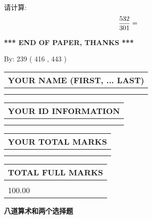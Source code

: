 \documentclass{ctexart}
\begin{document}
  
 
请计算:
\begin{equation}
\frac { %
532 }  {  %
301} = \nonumber
\end{equation}
 

 

 
   
   
 \vspace{0.2in}
 
   
   
   
   
\vspace{1.0in} 
{\textbf{\large{ *** END OF PAPER, THANKS *** }}} 
   
   
\hspace{1.0in} By: 
 239 ( 416 ,  443 )
   
   
   
   
\newpage 
\setcounter{page}{ 
   434001 } 
   
   
   
   
\noindent\begin{tabular}{|l|}
\hline
YOUR NAME (FIRST, ... LAST)  \\
\hline
 \\ 
 \\ 
\hline
\end{tabular}
\hspace{0.05in} \begin{tabular}{|l|}
\hline
 YOUR   ID   INFORMATION  \\
\hline
 \\ 
 \\ 
\hline
\end{tabular}
   
   
\vspace{0.2in}\noindent\begin{tabular}{|l|}
\hline
YOUR TOTAL MARKS  \\
\hline
 \\ 
 \\ 
\hline
\end{tabular}
\hspace{0.05in} \begin{tabular}{|l|}
\hline
TOTAL FULL MARKS  \\
\hline
 \\ 
100.00 \\
\hline
\end{tabular}
   
   
 \vspace{0.2in}
{\LARGE {\textbf{ 八道算术和两个选择题}}}
   
\end{document}

